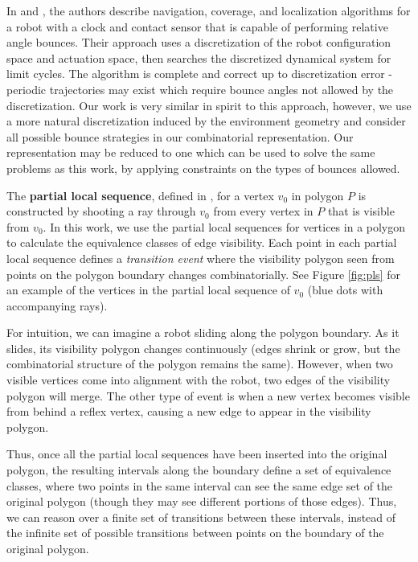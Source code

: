 \documentclass[]{article}  %
\begin{document}
In \cite{alam2017minimalist} and \cite{alam2018space}, the authors describe
navigation, coverage, and localization algorithms for a robot with a clock and
contact sensor that is capable of performing relative angle bounces. Their
approach uses a discretization of the robot configuration space and actuation
space, then searches the discretized dynamical system for limit cycles. The
algorithm is complete and correct up to discretization error - periodic
trajectories may exist which require bounce angles not allowed by the
discretization. Our work is very similar in spirit to this approach, however, we
use a more natural discretization induced by the environment geometry and
consider all possible bounce strategies in our combinatorial representation. Our
representation may be reduced to one which can be used to solve the same
problems as this work, by applying constraints on the types of bounces allowed.


The \textbf{partial local sequence}, defined in \cite{rourke_viz}, 
for a vertex $v_0$ in polygon $P$ is constructed 
by shooting a ray through $v_0$ from every vertex in $P$ that is visible from
$v_0$. In this work, we use the partial local sequences for vertices in a polygon to calculate 
the equivalence classes of edge visibility. Each point in each partial local
sequence defines a \emph{transition event} where the visibility polygon seen
from points on the polygon boundary changes combinatorially. See Figure \ref{fig:pls} for an example of the vertices in the partial local
sequence of $v_0$ (blue dots with accompanying rays).

For intuition, we can imagine a robot sliding along the polygon boundary. As it
slides, its visibility polygon changes continuously (edges shrink or grow, but
the combinatorial structure of the polygon remains the same). However, when two
visible vertices come into alignment with the robot, two edges of the visibility polygon will
merge. The other type of event is when a new vertex becomes visible from behind
a reflex vertex, causing a new edge to appear in the visibility polygon.

Thus, once all the
partial local sequences have been inserted into the original polygon, the
resulting intervals along the boundary define a set of equivalence classes,
where two points in the same interval can see the same edge set of the
original polygon (though they may see different portions of those edges). 
Thus, we can reason over a finite set of transitions between these
intervals, instead of the infinite set of possible transitions between points on
the boundary of the original polygon.
\end{document}
